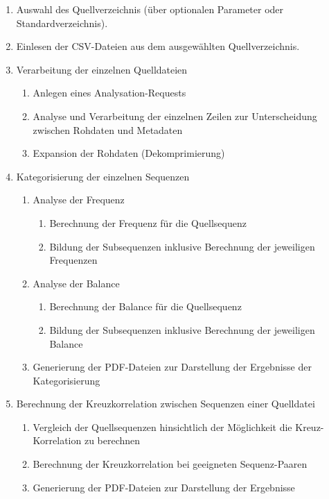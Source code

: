 \begin{enumerate}[nolistsep]
	\item Auswahl des Quellverzeichnis (über optionalen Parameter oder Standardverzeichnis).
	\item Einlesen der CSV-Dateien aus dem ausgewählten Quellverzeichnis.
	\item Verarbeitung der einzelnen Quelldateien
	\begin{enumerate}[nolistsep]
		\item Anlegen eines Analysation-Requests
		\item Analyse und Verarbeitung der einzelnen Zeilen zur Unterscheidung zwischen Rohdaten und Metadaten
		\item Expansion der Rohdaten (Dekomprimierung)
	\end{enumerate}
	\item Kategorisierung der einzelnen Sequenzen
	\begin{enumerate}[nolistsep]
		\item Analyse der Frequenz
		\begin{enumerate}[nolistsep]
			\item Berechnung der Frequenz für die Quellsequenz
			\item Bildung der Subsequenzen inklusive Berechnung der jeweiligen Frequenzen
		\end{enumerate}
		\item Analyse der Balance
			\begin{enumerate}[nolistsep]
			\item Berechnung der Balance für die Quellsequenz
			\item Bildung der Subsequenzen inklusive Berechnung der jeweiligen Balance
		\end{enumerate}
		\item Generierung der PDF-Dateien zur Darstellung der Ergebnisse der Kategorisierung
	\end{enumerate}
	\item Berechnung der Kreuzkorrelation zwischen Sequenzen einer Quelldatei
	\begin{enumerate}[nolistsep]
		\item Vergleich der Quellsequenzen hinsichtlich der Möglichkeit die Kreuz-Korrelation zu berechnen
		\item Berechnung der Kreuzkorrelation bei geeigneten Sequenz-Paaren
		\item Generierung der PDF-Dateien zur Darstellung der Ergebnisse
	\end{enumerate}
\end{enumerate}

